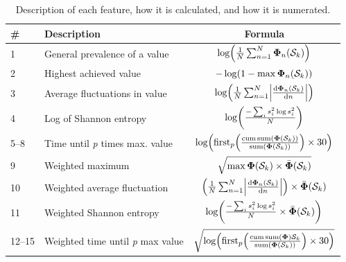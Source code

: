 \begin{table}[t]
\begin{adjustwidth*}{}{}
\small
\renewcommand{\arraystretch}{1.2}
\begin{threeparttable}
    \caption[Description of narcolepsy features]{Description of each feature, how it is calculated, and how it is numerated.}
    \label{tab:sleep-disorders:paper-iii:table-s10}
    \begin{tabular}{@{}llc@{}} \toprule
        \textbf{\#} & \textbf{Description} & \textbf{Formula} \\ \midrule
        \num{1} & General prevalence of a value & \( \func{\log}{\frac{1}{N} \sum_{n=1}^{N}{\func{\boldsymbol{\Phi}_{n}}{\mathcal{S}_{k}}}} \) \\
        \num{2} & Highest achieved value & \( \func{-\log}{1 - \max \func{\boldsymbol{\Phi}_{n}}{\mathcal{S}_{k}}} \) \\
        \num{3} & Average fluctuations in value & \( \func{\log}{ \frac{1}{N} \sum_{n=1}^{N} \left| \frac{ \mathrm{d} \func{\boldsymbol{\Phi}_{n}}{\mathcal{S}_{k}} }{ \mathrm{d} n } \right| } \) \\
        \num{4} & Log of Shannon entropy & \( \func{\log}{ \frac{-\sum_{i} s_{i}^{2} \log s_{i}^{2}}{N} } \) \\
        \numrange[range-phrase = --]{5}{8} & Time until \textit{p} times max. value & \( \func{\log}{ \func{\mathrm{first}_{p}}{ \frac{ \func{\mathrm{cum \, sum}}{ \func{\boldsymbol{\Phi}}{\mathcal{S}_{k}} }}{ \func{\mathrm{sum}}{ \func{\boldsymbol{\Phi}}{\mathcal{S}_{k}} } } } \times 30} \) \\
        \num{9} & Weighted maximum & \( \sqrt{\max \func{\boldsymbol{\Phi}}{\mathcal{S}_{k}} \times \func{\bar{ \boldsymbol{\Phi}}}{\mathcal{S}_{k}} } \) \\
        \num{10} & Weighted average fluctuation & \( \parentheses*{ \frac{1}{N} \sum_{n=1}^{N} \left| \frac{ \mathrm{d} \func{\boldsymbol{\Phi}_{n}}{\mathcal{S}_{k}} }{ \mathrm{d} n } \right| } \times \func{\bar{ \boldsymbol{\Phi}}}{\mathcal{S}_{k}} \) \\
        \num{11} & Weighted Shannon entropy & \( \func{\log}{ \frac{-\sum_{i} s_{i}^{2} \log s_{i}^{2}}{N} \times \func{\bar{ \boldsymbol{\Phi}}}{\mathcal{S}_{k}} } \) \\
        \numrange[range-phrase = --]{12}{15} & Weighted time until \textit{p} max value & \( \sqrt{ \func{\log}{ \func{\mathrm{first}_{p}}{ \frac{ \func{\mathrm{cum \, sum}}{ \boldsymbol{\Phi}}{\mathcal{S}_{k}} }{ \func{\mathrm{sum}}{ \func{\boldsymbol{\Phi}}{\mathcal{S}_{k}} } } } \times 30} } \) \\

\end{tabular}
\end{threeparttable}
\end{adjustwidth*}
\end{table}
